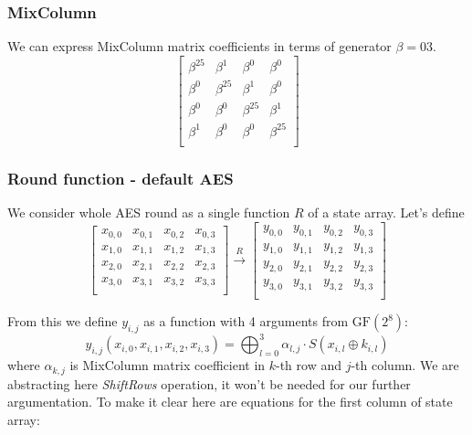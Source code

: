\documentclass[11pt,oneside,final]{fithesis2}
\begin{document}
	\subsubsection*{MixColumn}
	We can express MixColumn matrix coefficients in terms of generator $\beta = 03$.
	\[
	\begin{bmatrix}
		    \beta^{25} & \beta^{1} & \beta^{0} & \beta^{0}\\
		    \beta^{0} & \beta^{25} & \beta^{1} & \beta^{0}\\
		    \beta^{0} & \beta^{0} & \beta^{25} & \beta^{1}\\
		    \beta^{1} & \beta^{0} & \beta^{0} & \beta^{25}\\
	\end{bmatrix}
	\]

	\subsubsection*{Round function - default AES}
	We consider whole AES round as a single function $R$ of a state array. Let's define
	\[
	\begin{bmatrix} 
	    x_{0,0} & x_{0,1} & x_{0,2} & x_{0,3}\\
	    x_{1,0} & x_{1,1} & x_{1,2} & x_{1,3}\\
	    x_{2,0} & x_{2,1} & x_{2,2} & x_{2,3}\\
	    x_{3,0} & x_{3,1} & x_{3,2} & x_{3,3}\\
	\end{bmatrix} 
	\overset{R}{\longrightarrow}
	\begin{bmatrix} 
	    y_{0,0} & y_{0,1} & y_{0,2} & y_{0,3}\\
	    y_{1,0} & y_{1,1} & y_{1,2} & y_{1,3}\\
	    y_{2,0} & y_{2,1} & y_{2,2} & y_{2,3}\\
	    y_{3,0} & y_{3,1} & y_{3,2} & y_{3,3}\\
	\end{bmatrix} 
	\]

	From this we define $y_{i,j}$ as a function with 4 arguments from $\text{GF}(2^8)$:
	\begin{equation}
	y_{i,j}\left(x_{i,0}, x_{i,1}, x_{i,2}, x_{i,3}\right) = \bigoplus^3_{l=0} \alpha_{l,j} \cdot S(x_{i,l} \oplus k_{i,l})
	\end{equation}
	where $\alpha_{k,j}$ is MixColumn matrix coefficient in $k$-th row and $j$-th column. We are abstracting here \emph{ShiftRows} operation, it won't be needed for our further argumentation.
	To make it clear here are equations for the first column of state array:
\end{document}

